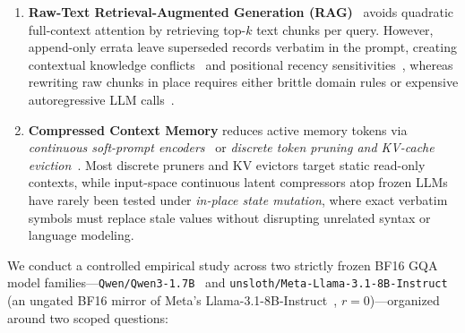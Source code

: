 \documentclass[11pt]{article}
\renewcommand{\_}{\origunderscore\allowbreak}
\begin{document}
\begin{enumerate}
    \item \textbf{Raw-Text Retrieval-Augmented Generation (RAG)}~\cite{lewis2020rag,robertson2009bm25,xiao2024bge} avoids quadratic full-context attention by retrieving top-$k$ text chunks per query. However, append-only errata leave superseded records verbatim in the prompt, creating contextual knowledge conflicts~\cite{longpre2021conflict} and positional recency sensitivities~\cite{liu2024lost}, whereas rewriting raw chunks in place requires either brittle domain rules or expensive autoregressive LLM calls~\cite{packer2023memgpt,chhikara2025mem0}.
    \item \textbf{Compressed Context Memory} reduces active memory tokens via \emph{continuous soft-prompt encoders}~\cite{mu2023gist,chevalier2023autocompressors,ge2024icae,cheng2024xrag,li2025compressor500x,fallahpour2026memorilla} or \emph{discrete token pruning and KV-cache eviction}~\cite{pan2024llmlingua2,chirkova2025provence,zhang2023h2o,li2024snapkv}. Most discrete pruners and KV evictors target static read-only contexts, while input-space continuous latent compressors atop frozen LLMs have rarely been tested under \emph{in-place state mutation}, where exact verbatim symbols must replace stale values without disrupting unrelated syntax or language modeling.
\end{enumerate}

We conduct a controlled empirical study across two strictly frozen BF16 GQA model families---\texttt{Qwen/Qwen3-1.7B}~\cite{yang2025qwen3} and \texttt{unsloth/Meta-Llama-3.1-8B-Instruct} (an ungated BF16 mirror of Meta's Llama-3.1-8B-Instruct~\cite{dubey2024llama3}, $r=0$)---organized around two scoped questions:
\end{document}
